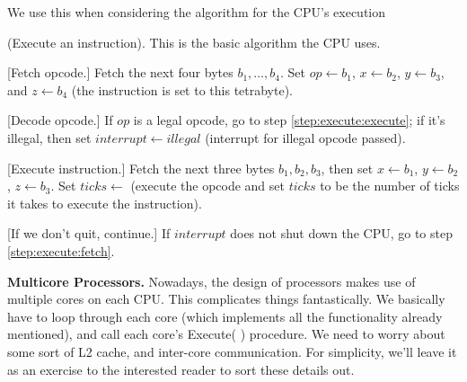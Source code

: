 We use this when considering the algorithm for the CPU's execution


\summary (Execute an instruction). {This is the basic algorithm
  the CPU uses.}
\begin{myalgorithm}
\item {[Fetch opcode.]}\label{step:execute:fetch} Fetch the next four bytes
  $b_{1},\ldots,b_{4}$. Set $op\gets b_{1}$, $x\gets b_{2}$,
  $y\gets b_{3}$, and $z\gets b_{4}$
  (the instruction is set to this tetrabyte). 
\item {[Decode opcode.]} If $op$ is a legal opcode, go
  to step \ref{step:execute:execute}; if it's illegal, then set
  $interrupt\gets illegal$ (interrupt for illegal opcode passed).
\item {[Execute instruction.]}\label{step:execute:execute} Fetch the next three bytes $b_{1},b_{2},b_{3}$,
  then set $x\gets b_{1}$, $y\gets b_{2}$, $z\gets b_{3}$. Set
  $ticks\gets$  (execute the opcode
  and set $ticks$ to be the number of ticks it takes to execute
  the instruction).  
\item {[If we don't quit, continue.]} If $interrupt$ does not
  shut down the CPU, go to step \ref{step:execute:fetch}.
\end{myalgorithm}


\noindent\textbf{Multicore Processors.} Nowadays, the design of
processors makes use of multiple cores on each CPU. This
complicates things fantastically. We basically have to loop
through each core (which implements all the functionality already
mentioned), and call each core's {\sc Execute(\! )} procedure. We
need to worry about some sort of L2 cache, and inter-core
communication. For simplicity, we'll leave it as an exercise to
the interested reader to sort these details out.
